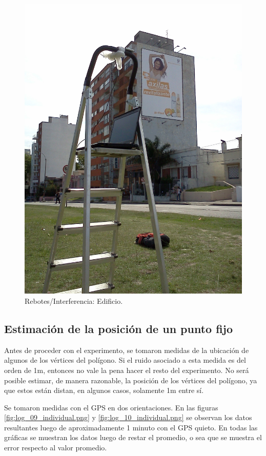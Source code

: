 \documentclass[spanish,12pt,a4paper,titlepage]{report}
\begin{document}
\newpage
\begin{figure}[h!]
  \begin{center}
  \includegraphics[width=.9\textwidth]{./img/gps_interf1.jpg}
  \end{center}
  \caption{Rebotes/Interferencia: Edificio.}
  \label{fig:gps_interf1.jpg}
\end{figure}

\newpage
\subsection{Estimación de la posición de un punto fijo}
\label{sec:estimacion-de-la-posicion-de-un-punto-fijo}

Antes de proceder con el experimento, se tomaron medidas de la ubicación de algunos de los vértices del polígono. Si el ruido asociado a esta medida es del orden de 1m, entonces no vale la pena hacer el resto del experimento. No será posible estimar, de manera razonable, la posición de los vértices del polígono, ya que estos están distan, en algunos casos, solamente 1m entre sí.

Se tomaron medidas con el GPS en dos orientaciones. En las figuras \ref{fig:log_09_individual.png} y \ref{fig:log_10_individual.png} se observan los datos resultantes luego de aproximadamente 1 minuto con el GPS quieto. En todas las gráficas se muestran los datos luego de restar el promedio, o sea que se muestra el error respecto al valor promedio.
\end{document}
